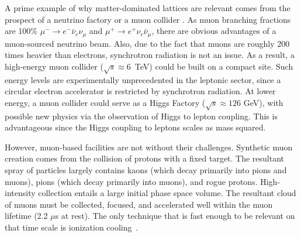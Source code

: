 \documentclass{jacow}
\begin{document}
A prime example of why matter-dominated lattices are relevant comes from the prospect of a neutrino factory or a muon collider \cite{map}. As muon branching fractions are 100\% $\mu^-\rightarrow e^- \bar{\nu}_e \nu_\mu$ and $\mu^+\rightarrow e^+ \nu_e \bar{\nu}_\mu$, there are obvious advantages of a muon-sourced neutrino beam. Also, due to the fact that muons are roughly 200 times heavier than electrons, synchrotron radiation is not an issue. As a result, a high-energy muon collider ($\sqrt{s}\approx 6$~TeV) could be built on a compact site. Such energy levels are experimentally unprecedented in the leptonic sector, since a circular electron accelerator is restricted by synchrotron radiation. At lower energy, a muon collider could serve as a Higgs Factory ($\sqrt{s} \approx 126$ GeV), with possible new physics via the observation of Higgs to lepton coupling. This is advantageous since the Higgs coupling to leptons scales as mass squared. 


However, muon-based facilities are not without their challenges. Synthetic muon creation comes from the collision of protons with a fixed target. The resultant spray of particles largely contains kaons (which decay primarily into pions and muons), pions (which decay primarily into muons), and rogue protons. High-intensity collection entails a large initial phase space volume. The resultant cloud of muons must be collected, focused, and accelerated well within the muon lifetime (2.2 $\mu$s at rest). The only technique that is fast enough to be relevant on that time scale is ionization cooling~\cite{Parkhomchuk}.



\end{document}
